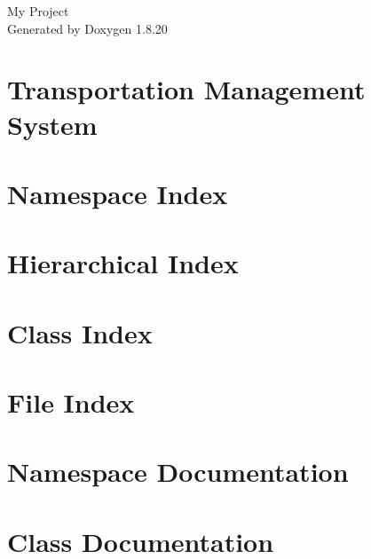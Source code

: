 \let\mypdfximage\pdfximage\def\pdfximage{\immediate\mypdfximage}\documentclass[twoside]{book}
\newcommand{\+}{\discretionary{\mbox{\scriptsize$\hookleftarrow$}}{}{}}
\newcommand{\clearemptydoublepage}{%
  \newpage{\pagestyle{empty}\cleardoublepage}%
}
\begin{document}
\hypersetup{pageanchor=false,
             bookmarksnumbered=true,
             pdfencoding=unicode
            }
\begin{titlepage}
\vspace*{7cm}
\begin{center}%
{\Large My Project }\\
\vspace*{1cm}
{\large Generated by Doxygen 1.8.20}\\
\end{center}
\end{titlepage}
\clearemptydoublepage
{}
\tableofcontents
\clearemptydoublepage
{}
\hypersetup{pageanchor=true}

\chapter{Transportation Management System}
\label{index}\hypertarget{index}{}
\chapter{Namespace Index}

\chapter{Hierarchical Index}

\chapter{Class Index}

\chapter{File Index}

\chapter{Namespace Documentation}




\chapter{Class Documentation}























\end{document}
